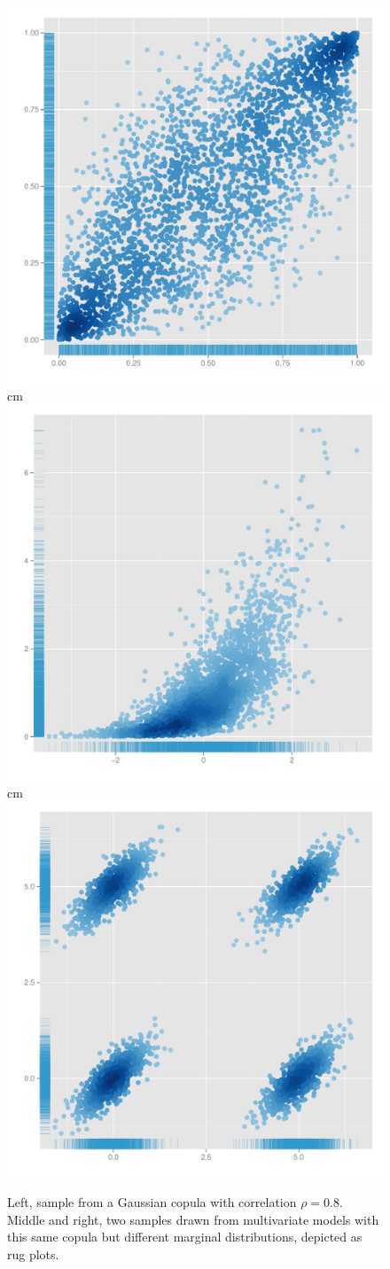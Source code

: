 \documentclass{article}
\begin{document}
\begin{figure}
  \begin{center}
      {\includegraphics[width=0.28\linewidth]{figures/system0.pdf}} cm
      {\includegraphics[width=0.28\linewidth]{figures/system1.pdf}} cm
      {\includegraphics[width=0.28\linewidth]{figures/system2.pdf}}
  \end{center}
  \caption{Left, sample from a Gaussian copula with correlation $\rho = 0.8$.
  Middle and right, two samples drawn from multivariate models with this same
  copula but different marginal distributions, depicted as rug plots.}
  \label{fig:twosamples}
\end{figure}
\end{document}
